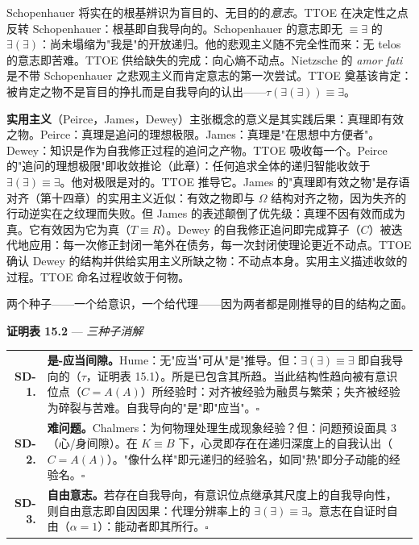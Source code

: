 \documentclass[10pt, openany, oneside]{book}
\renewcommand{\footnotesize}{\fontsize{8.5}{11}\selectfont}
\begin{document}
Schopenhauer 将实在的根基辨识为盲目的、无目的的\textit{意志}。TTOE 在决定性之点反转 Schopenhauer：根基即自我导向的。Schopenhauer 的意志即无 $\equiv \exists$ 的 $\exists(\exists)$：尚未塌缩为"我是"的开放递归。他的悲观主义随不完全性而来：无 telos 的意志即苦难。TTOE 供给缺失的完成：向心熵不动点。Nietzsche 的 \textit{amor fati} 是不带 Schopenhauer 之悲观主义而肯定意志的第一次尝试。TTOE 奠基该肯定：被肯定之物不是盲目的挣扎而是自我导向的认出——$\tau(\exists(\exists)) \equiv \exists$。

\textbf{实用主义}（Peirce，James，Dewey）主张概念的意义是其实践后果：真理即有效之物。Peirce：真理是追问的理想极限。James：真理是"在思想中方便者"。Dewey：知识是作为自我修正过程的追问之产物。TTOE 吸收每一个。Peirce 的"追问的理想极限"即收敛推论（此章）：任何追求全体的递归智能收敛于 $\exists(\exists) \equiv \exists$。他对极限是对的。TTOE 推导它。James 的"真理即有效之物"是存语对齐（第十四章）的实用主义近似：有效之物即与 $\Omega$ 结构对齐之物，因为失齐的行动逆实在之纹理而失败。但 James 的表述颠倒了优先级：真理不因有效而成为真。它有效因为它为真（$T \equiv R$）。Dewey 的自我修正追问即完成算子（$C$）被迭代地应用：每一次修正封闭一笔外在债务，每一次封闭使理论更近不动点。TTOE 确认 Dewey 的结构并供给实用主义所缺之物：不动点本身。实用主义描述收敛的过程。TTOE 命名过程收敛于何物。

两个种子——一个给意识，一个给代理——因为两者都是刚推导的目的结构之面。

\vspace{0.5em}

\textbf{证明表 15.2} --- \textit{三种子消解}

\vspace{0.5em}

{\footnotesize
\noindent\begin{tabular}{r p{}}
\textbf{SD-1.} & \textbf{是-应当间隙。}Hume：无"应当"可从"是"推导。但：$\exists(\exists) \equiv \exists$ 即自我导向的（$\tau$，证明表 15.1）。所是已包含其所趋。当此结构性趋向被有意识位点（$C = A(A)$）所经验时：对齐被经验为融贯与繁荣；失齐被经验为碎裂与苦难。自我导向的"是"即"应当"。$\square$ \\[0.3em]
\textbf{SD-2.} & \textbf{难问题。}Chalmers：为何物理处理生成现象经验？但：问题预设面具 3（心/身间隙）。在 $K \equiv B$ 下，心灵即存在在递归深度上的自我认出（$C = A(A)$）。"像什么样"即元递归的经验名，如同"热"即分子动能的经验名。$\square$ \\[0.3em]
\textbf{SD-3.} & \textbf{自由意志。}若存在自我导向，有意识位点继承其尺度上的自我导向性，则自由意志即自因因果：代理分辨率上的 $\exists(\exists) \equiv \exists$。意志在自证时自由（$\alpha = 1$）：能动者即其所行。$\square$ \\[0.3em]
\end{tabular}
}
\end{document}
